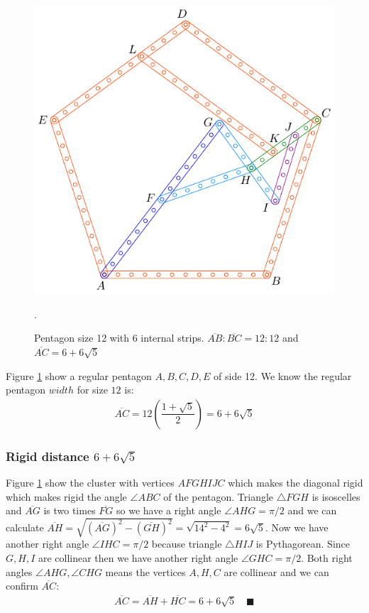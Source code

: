 \documentclass[11pt]{article}
\begin{document}
\begin{figure}[h]
 \centering
 \includegraphics[scale=1.1]{12/penta12-6a}
 \caption{Pentagon size 12 with 6 internal strips. $\overline{AB}:\overline{BC} = 12:12$ and $\overline{AC} = 6 + 6\sqrt5$}.
 \label{fig:penta12-6a}
\end{figure}

Figure \ref{fig:penta12-6a} show a regular pentagon $A,B,C,D,E$ of side 12. We know the regular pentagon $width$ for size $12$ is:
\begin{align}
\overline{AC} = 12\left(\dfrac{1+\sqrt5}2\right) = 6 + 6\sqrt5
\end{align}

\subsubsection{Rigid distance $6 + 6\sqrt5$}

Figure \ref{fig:penta12-6a} show the cluster with vertices $AFGHIJC$ which makes the diagonal rigid which makes rigid the angle $\angle{ABC}$ of the pentagon. Triangle $\triangle{FGH}$ is isoscelles and $\overline{AG}$ is two times $\overline{FG}$ so we have a right angle $\angle{AHG} = \pi/2$ and we can calculate $\overline{AH} = \sqrt{(\overline{AG})^2 - (\overline{GH})^2} = \sqrt{14^2-4^2} = 6\sqrt5$. Now we have another right angle $\angle{IHC} = \pi/2$ because triangle $\triangle{HIJ}$ is Pythagorean. Since $G,H,I$ are collinear then we have another right angle $\angle{GHC}= \pi/2$. Both right angles $\angle{AHG},\angle{CHG}$ means the vertices $A,H,C$ are collinear and we can confirm $\overline{AC}$:
\begin{align}
\overline{AC} = \overline{AH} + \overline{HC} = 6 + 6\sqrt5 \quad \blacksquare
\end{align}
\end{document}
